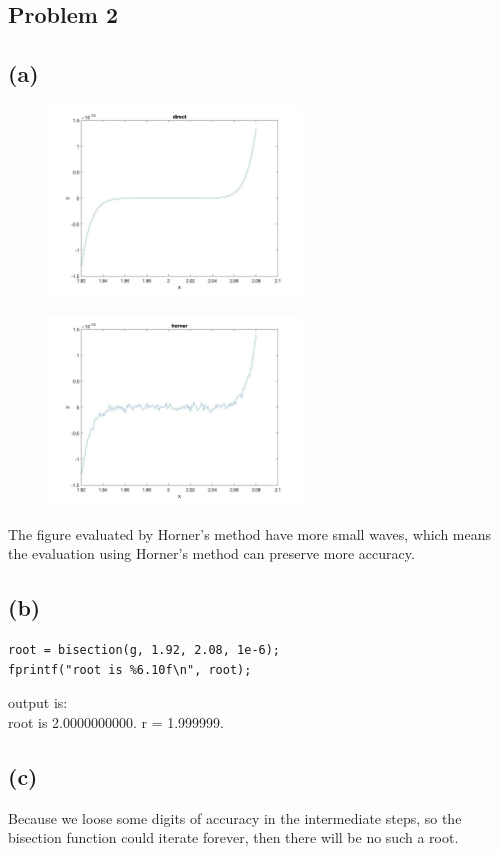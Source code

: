 \documentclass[11pt,fleqn]{exam}
\begin{document}
\subsection*{Problem 2}
\subsection*{(a)}
\begin{figure}[H]
  	\centering
  	\includegraphics[width=0.6\textwidth]{q2a1.jpg}
\end{figure}	
\begin{figure}[H]
  	\centering
  	\includegraphics[width=0.6\textwidth]{q2a2.jpg}
\end{figure}	
The figure evaluated by Horner's method have more small waves, which means the evaluation using Horner's method can preserve more accuracy.

\subsection*{(b)}
\begin{lstlisting}
root = bisection(g, 1.92, 2.08, 1e-6);
fprintf("root is %6.10f\n", root);
\end{lstlisting}
output is:\\
root is 2.0000000000.
r =  1.999999.

\subsection*{(c)}
Because we loose some digits of accuracy in the intermediate steps, so the bisection function could iterate forever, then there will be no such a root.
\end{document}
